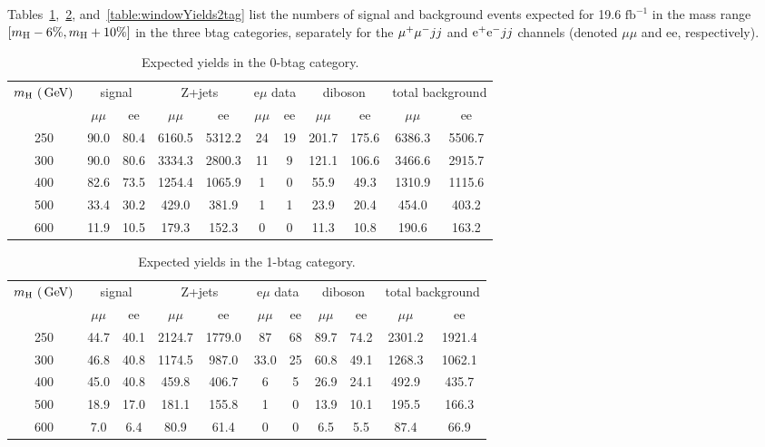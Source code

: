
Tables~\ref{table:windowYields0tag},~\ref{table:windowYields1tag}, and~\ref{table:windowYields2tag} list 
the numbers of signal and background events expected for 19.6 $\text{fb}^{-1}$
in the mass range $[m_{\mathrm{H}} -6\%, m_{\mathrm{H}}+10\%]$ in the three btag categories, separately for the $\mu^+\mu^- jj$
and $\mathrm{e^+e^-} jj$ channels (denoted $\mu\mu$ and ee, respectively).

\begin{table}[h!]
\caption{Expected yields in the 0-btag category.}
\label{table:windowYields0tag}
\centering
\begin{tabular}{|c|c|c|c|c|c|c|c|c|c|c|} \hline
    $m_{\mathrm{H}}~(\,\text{Ge\hspace{-.08em}V})$   & \multicolumn{2}{c|}{signal}      & \multicolumn{2}{c|}{Z+jets} & \multicolumn{2}{c|}{e$\mu$ data} & \multicolumn{2}{c|}{diboson} & \multicolumn{2}{c|}{total background} \\ \cline{2-11}
                 & $\mu\mu$ & ee &  $\mu\mu$ &  ee &  $\mu\mu$ &  ee &  $\mu\mu$ &  ee & $\mu\mu$ & ee \\\hline
    250  &  90.0 & 80.4 & 6160.5 & 5312.2 &24 & 19  &201.7 & 175.6 &6386.3 & 5506.7 \\
    300  &  90.0 & 80.6 & 3334.3 & 2800.3 & 11 & 9  &121.1 & 106.6 &3466.6 & 2915.7 \\
    400  &  82.6 & 73.5 & 1254.4 & 1065.9 & 1 & 0   & 55.9 & 49.3 & 1310.9 & 1115.6 \\
    500 &33.4 & 30.2 &429.0 & 381.9 &1 & 1  &23.9 & 20.4 &454.0 & 403.2 \\
    600&11.9 & 10.5 &179.3 & 152.3 &0 & 0  &11.3 & 10.8 &190.6 & 163.2 \\\hline
\end{tabular}
\end{table}

\begin{table}[h!]
\caption{Expected yields in the 1-btag category.}
\label{table:windowYields1tag}
\centering
\begin{tabular}{|c|c|c|c|c|c|c|c|c|c|c|} \hline
    $m_{\mathrm{H}}~(\,\text{Ge\hspace{-.08em}V})$   & \multicolumn{2}{c|}{signal}      & \multicolumn{2}{c|}{Z+jets} & \multicolumn{2}{c|}{e$\mu$ data} & \multicolumn{2}{c|}{diboson} & \multicolumn{2}{c|}{total background} \\ \cline{2-11}
                 & $\mu\mu$ & ee &  $\mu\mu$ &  ee &  $\mu\mu$ &  ee &  $\mu\mu$ &  ee & $\mu\mu$ & ee \\\hline
    250 & 44.7 & 40.1 &2124.7 & 1779.0 &87 & 68  &89.7 & 74.2 &2301.2 & 1921.4 \\
    300 & 46.8 & 40.8 &1174.5 & 987.0 &33.0 & 25  &60.8 & 49.1 &1268.3 & 1062.1 \\
    400&45.0 & 40.8 &459.8 & 406.7 &6 & 5  &26.9 & 24.1 &492.9 & 435.7 \\
    500&18.9 & 17.0 &181.1 & 155.8 &1 & 0  &13.9 & 10.1 &195.5 & 166.3 \\
    600 & 7.0 & 6.4 &80.9 & 61.4  &0 & 0  &6.5 & 5.5 &87.4 & 66.9 \\\hline
\end{tabular}
\end{table}

